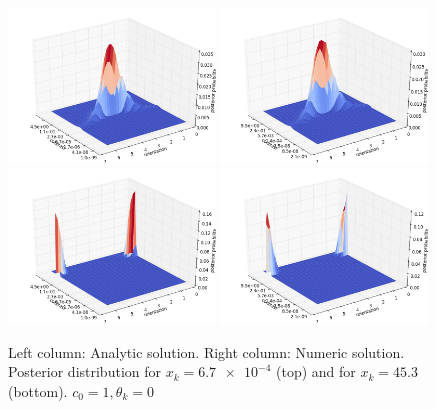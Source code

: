 \documentclass{scrartcl}
\begin{document}
\begin{figure}[h]
\centering
\includegraphics[width=0.49\textwidth, clip]{../pics/post_analytic_lowresp}
\includegraphics[width=0.49\textwidth, clip]{../pics/post_numeric_lowresp} \\
\includegraphics[width=0.49\textwidth, clip]{../pics/post_analytic_highresp}
\includegraphics[width=0.49\textwidth, clip]{../pics/post_numeric_highresp}\\
\caption{Left column: Analytic solution. Right column: Numeric solution. Posterior distribution for $x_k=\num{6.7e-4}$ (top) and for $x_k=45.3$ (bottom). $c_0 = 1, \theta_k = 0$}
\label{posts}
\end{figure}
\end{document}
